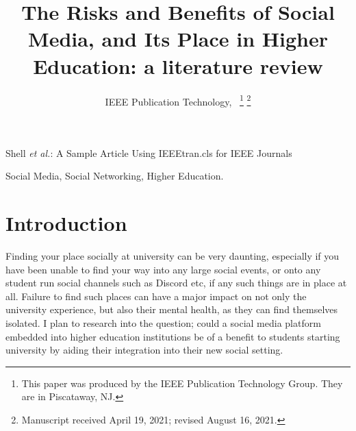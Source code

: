 \documentclass[lettersize,journal]{IEEEtran}
\begin{document}
\title{The Risks and Benefits of Social Media, and Its Place in Higher Education: a literature review}

\author{IEEE Publication Technology,~
\thanks{This paper was produced by the IEEE Publication Technology Group. They are in Piscataway, NJ.}%
\thanks{Manuscript received April 19, 2021; revised August 16, 2021.}}

%
{Shell \MakeLowercase{\textit{et al.}}: A Sample Article Using IEEEtran.cls for IEEE Journals}


\maketitle

\begin{abstract}
\end{abstract}

\begin{IEEEkeywords}
Social Media, Social Networking, Higher Education.
\end{IEEEkeywords}

\section{Introduction}
        Finding your place socially at university can be very daunting,
        especially if you have been unable to find your way into any large
        social events, or onto any student run social channels such as Discord
        etc, if any such things are in place at all. Failure to find such
        places can have a major impact on not only the university experience,
        but also their mental health, as they can find themselves isolated. I
        plan to research into the question; could a social media platform embedded into higher education institutions be of a benefit to students starting university by aiding their integration into their new
        social setting.
\end{document}

